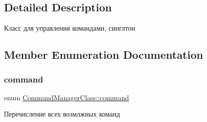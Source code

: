 \subsection{Detailed Description}
Класс для управления командами, синглтон 

\subsection{Member Enumeration Documentation}
\mbox{\label{class_command_manager_class_aff5b4b6301c24b585b22c6abaf4f3131}} 
\subsubsection{\texorpdfstring{command}{command}}
{\footnotesize\ttfamily enum \hyperlink{class_command_manager_class_aff5b4b6301c24b585b22c6abaf4f3131}{Command\+Manager\+Class\+::command}}



Перечисление всех возмлжных команд 

